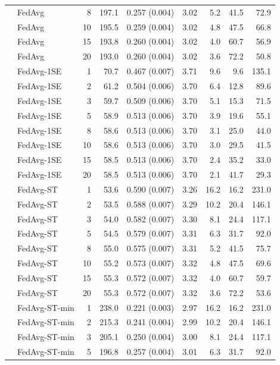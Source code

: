 \begin{longtable}{llrrrrrrr}
 & FedAvg & 8 & 197.1 & 0.257 (0.004) & 3.02 & 5.2 & 41.5 & 72.9 \\
 & FedAvg & 10 & 195.5 & 0.259 (0.004) & 3.02 & 4.8 & 47.5 & 66.8 \\
 & FedAvg & 15 & 193.8 & 0.260 (0.004) & 3.02 & 4.0 & 60.7 & 56.9 \\
 & FedAvg & 20 & 193.0 & 0.260 (0.004) & 3.02 & 3.6 & 72.2 & 50.8 \\
 & FedAvg-1SE & 1 & 70.7 & 0.467 (0.007) & 3.71 & 9.6 & 9.6 & 135.1 \\
 & FedAvg-1SE & 2 & 61.2 & 0.504 (0.006) & 3.70 & 6.4 & 12.8 & 89.6 \\
 & FedAvg-1SE & 3 & 59.7 & 0.509 (0.006) & 3.70 & 5.1 & 15.3 & 71.5 \\
 & FedAvg-1SE & 5 & 58.9 & 0.513 (0.006) & 3.70 & 3.9 & 19.6 & 55.1 \\
 & FedAvg-1SE & 8 & 58.6 & 0.513 (0.006) & 3.70 & 3.1 & 25.0 & 44.0 \\
 & FedAvg-1SE & 10 & 58.6 & 0.513 (0.006) & 3.70 & 3.0 & 29.5 & 41.5 \\
 & FedAvg-1SE & 15 & 58.5 & 0.513 (0.006) & 3.70 & 2.4 & 35.2 & 33.0 \\
 & FedAvg-1SE & 20 & 58.5 & 0.513 (0.006) & 3.70 & 2.1 & 41.7 & 29.3 \\
 & FedAvg-ST & 1 & 53.6 & 0.590 (0.007) & 3.26 & 16.2 & 16.2 & 231.0 \\
 & FedAvg-ST & 2 & 53.5 & 0.588 (0.007) & 3.29 & 10.2 & 20.4 & 146.1 \\
 & FedAvg-ST & 3 & 54.0 & 0.582 (0.007) & 3.30 & 8.1 & 24.4 & 117.1 \\
 & FedAvg-ST & 5 & 54.5 & 0.579 (0.007) & 3.31 & 6.3 & 31.7 & 92.0 \\
 & FedAvg-ST & 8 & 55.0 & 0.575 (0.007) & 3.31 & 5.2 & 41.5 & 75.7 \\
 & FedAvg-ST & 10 & 55.2 & 0.573 (0.007) & 3.32 & 4.8 & 47.5 & 69.6 \\
 & FedAvg-ST & 15 & 55.3 & 0.572 (0.007) & 3.32 & 4.0 & 60.7 & 59.7 \\
 & FedAvg-ST & 20 & 55.3 & 0.572 (0.007) & 3.32 & 3.6 & 72.2 & 53.6 \\
 & FedAvg-ST-min & 1 & 238.0 & 0.221 (0.003) & 2.97 & 16.2 & 16.2 & 231.0 \\
 & FedAvg-ST-min & 2 & 215.3 & 0.241 (0.004) & 2.99 & 10.2 & 20.4 & 146.1 \\
 & FedAvg-ST-min & 3 & 205.1 & 0.250 (0.004) & 3.00 & 8.1 & 24.4 & 117.1 \\
 & FedAvg-ST-min & 5 & 196.8 & 0.257 (0.004) & 3.01 & 6.3 & 31.7 & 92.0 \\

\end{longtable}

